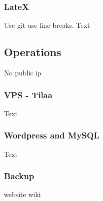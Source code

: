 \subsubsection{LateX}
Use git
use line breaks.
Text
\subsection{Operations}
No public ip

\subsubsection{VPS - Tilaa}
Text
\subsubsection{Wordpress and MySQL}
Text
\subsubsection{Backup}
website
wiki

